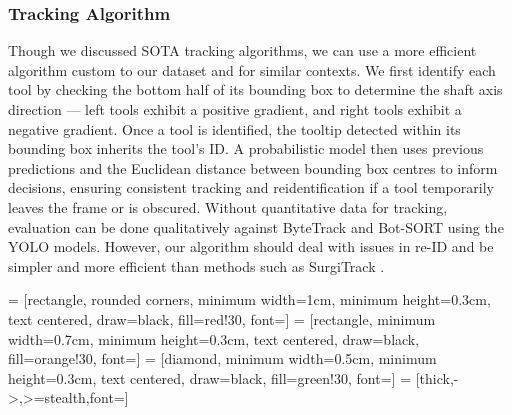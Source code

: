 \subsubsection{Tracking Algorithm}

Though we discussed SOTA tracking algorithms, we can use a more efficient algorithm custom to our dataset and for similar contexts. We first identify each tool by checking the bottom half of its bounding box to determine the shaft axis direction — left tools exhibit a positive gradient, and right tools exhibit a negative gradient. Once a tool is identified, the tooltip detected within its bounding box inherits the tool's ID. A probabilistic model then uses previous predictions and the Euclidean distance between bounding box centres to inform decisions, ensuring consistent tracking and reidentification if a tool temporarily leaves the frame or is obscured. Without quantitative data for tracking, evaluation can be done qualitatively against ByteTrack \cite{ByteTrack} and Bot-SORT \cite{BoT-SORT} using the YOLO models. However, our algorithm should deal with issues in re-ID and be simpler and more efficient than methods such as SurgiTrack \cite{SurgiTrack}.

 = [rectangle, rounded corners, minimum width=1cm, minimum height=0.3cm, text centered, draw=black, fill=red!30, font=\tiny]
 = [rectangle, minimum width=0.7cm, minimum height=0.3cm, text centered, draw=black, fill=orange!30, font=\tiny]
 = [diamond, minimum width=0.5cm, minimum height=0.3cm, text centered, draw=black, fill=green!30, font=\tiny]
 = [thick,->,>=stealth,font=\tiny]




